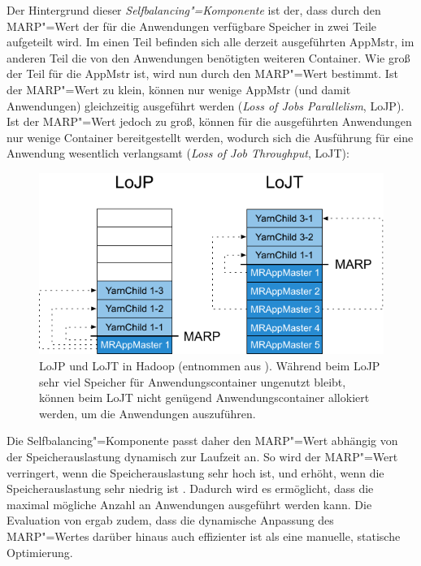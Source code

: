Der Hintergrund dieser \emph{Selfbalancing"=Komponente} ist der, dass durch den \ac{MARP}"=Wert der für die Anwendungen verfügbare Speicher in zwei Teile aufgeteilt wird.
Im einen Teil befinden sich alle derzeit ausgeführten \ac{AppMstr}, im anderen Teil die von den Anwendungen benötigten weiteren Container.
Wie groß der Teil für die \ac{AppMstr} ist, wird nun durch den \ac{MARP}"=Wert bestimmt.
Ist der \ac{MARP}"=Wert zu klein, können nur wenige \ac{AppMstr} (und damit Anwendungen) gleichzeitig ausgeführt werden (\emph{Loss of Jobs Parallelism}, LoJP).
Ist der \ac{MARP}"=Wert jedoch zu groß, können für die ausgeführten Anwendungen nur wenige Container bereitgestellt werden, wodurch sich die Ausführung für eine Anwendung wesentlich verlangsamt (\emph{Loss of Job Throughput}, LoJT)\cite{zhang2016}:

\begin{figure}[h]
    \includegraphics{./images/marpValue.pdf}
    \caption[LoJP und LoJT in Hadoop]
    {LoJP und LoJT in Hadoop (entnommen aus \cite{zhang2016}).
    Während beim LoJP sehr viel Speicher für Anwendungscontainer ungenutzt bleibt, können beim LoJT nicht genügend Anwendungscontainer allokiert werden, um die Anwendungen auszuführen.}
    \label{fig:marpValue}
\end{figure}

Die Selfbalancing"=Komponente passt daher den \ac{MARP}"=Wert abhängig von der Speicherauslastung dynamisch zur Laufzeit an.
So wird der \ac{MARP}"=Wert verringert, wenn die Speicherauslastung sehr hoch ist, und erhöht, wenn die Speicherauslastung sehr niedrig ist \cite{zhang2016}.
Dadurch wird es ermöglicht, dass die maximal mögliche Anzahl an Anwendungen ausgeführt werden kann.
Die Evaluation von \citeauthor{zhang2016} ergab zudem, dass die dynamische Anpassung des \ac{MARP}"=Wertes darüber hinaus auch effizienter ist als eine manuelle, statische Optimierung.

